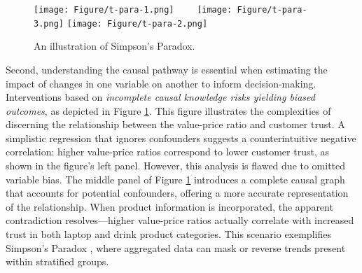 \begin{figure}[!thp] 
\centering 
 \texttt{[image: Figure/t-para-1.png]}~~~~
 \texttt{[image: Figure/t-para-3.png]} 
 \texttt{[image: Figure/t-para-2.png]} 
 
 \caption{An illustration of Simpson's Paradox.}\label{fig:t-para}
 \end{figure}
 
Second, understanding the causal pathway is essential when estimating the impact of changes in one variable on another to inform decision-making. Interventions based on \textit{incomplete causal knowledge risks yielding biased outcomes}, as depicted in Figure \ref{fig:t-para}. This figure illustrates the complexities of discerning the relationship between the value-price ratio and customer trust. A simplistic regression that ignores confounders suggests a counterintuitive negative correlation: higher value-price ratios correspond to lower customer trust, as shown in the figure's left panel. However, this analysis is flawed due to omitted variable bias. The middle panel of Figure \ref{fig:t-para} introduces a complete causal graph that accounts for potential confounders, offering a more accurate representation of the relationship. When product information is incorporated, the apparent contradiction resolves—higher value-price ratios actually correlate with increased trust in both laptop and drink product categories. This scenario exemplifies Simpson's Paradox \citep{blyth1972simpson}, where aggregated data can mask or reverse trends present within stratified groups.

